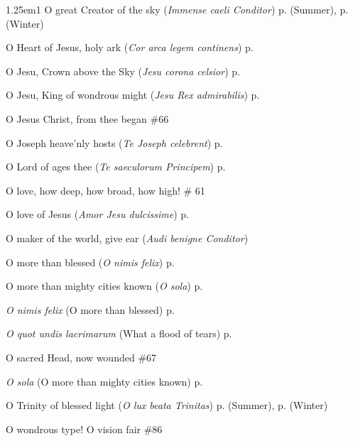 \begin{hangparas}{1.25em}{1}
O great Creator of the sky (\textit{Immense caeli Conditor}) \dotfill p. \pageref{MondayEvensongSummer} (Summer), p. \pageref{MondayEvensongWinter} (Winter)
\par\noindent
O Heart of Jesus, holy ark (\textit{Cor arca legem continens}) \dotfill p. \pageref{CompassionMattins}
\par\noindent
O Jesu, Crown above the Sky (\textit{Jesu corona celsior}) \dotfill p. \pageref{ConfessorNotBishopMattins}
\par\noindent
O Jesu, King of wondrous might (\textit{Jesu Rex admirabilis}) \dotfill p. \pageref{HolyNameInvitatoryHymn}
\par\noindent
O Jesus Christ, from thee began \dotfill \#66
\par\noindent
O Joseph heave'nly hosts (\textit{Te Joseph celebrent}) \dotfill p. \pageref{JosephEvensong}
\par\noindent
O Lord of ages thee (\textit{Te saeculorum Principem}) \dotfill p. \pageref{ChristTheKingEvensong}
\par\noindent
O love, how deep, how broad, how high! \dotfill \# 61
\par\noindent
O love of Jesus (\textit{Amor Jesu dulcissime}) \dotfill p. \pageref{TransfigurationMattins}
\par\noindent
O maker of the world, give ear (\textit{Audi benigne Conditor}) 
\par\noindent
O more than blessed (\textit{O nimis felix}) \dotfill p. \pageref{JohnBaptistMattins}
\par\noindent
O more than mighty cities known (\textit{O sola}) \dotfill p. \pageref{EpiphanyMattinsHymn}
\par\noindent
\textit{O nimis felix} (O more than blessed) \dotfill p. \pageref{JohnBaptistMattins}
\par\noindent
\textit{O quot undis lacrimarum} (What a flood of tears) \dotfill p. \pageref{SevenSorrowsInvitatory}
\par\noindent
O sacred Head, now wounded  \dotfill \#67
\par\noindent
\textit{O sola} (O more than mighty cities known) \dotfill p. \pageref{EpiphanyMattinsHymn}
\par\noindent
O Trinity of blessed light (\textit{O lux beata Trinitas}) \dotfill p. \pageref{SaturdayEvensongSummer} (Summer), p. \pageref{SaturdayEvensongWinter} (Winter)
\par\noindent
O wondrous type! O vision fair \dotfill \#86
\par\noindent

\end{hangparas}
